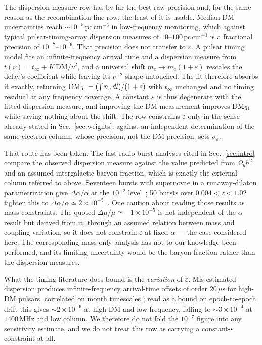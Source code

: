 \documentclass[aps,prd,twocolumn,superscriptaddress,nofootinbib,10pt]{revtex4-2}
\begin{document}
The dispersion-measure row has by far the best raw precision and, for the same reason as the
recombination-line row, the least of it is usable. Median DM uncertainties reach
$\sim\!10^{-5}\,\mathrm{pc\,cm^{-3}}$ in low-frequency monitoring, which against typical
pulsar-timing-array dispersion measures of $10$--$100\,\mathrm{pc\,cm^{-3}}$ is a fractional
precision of $10^{-7}$--$10^{-6}$. That precision does not transfer to $\varepsilon$. A pulsar
timing model fits an infinite-frequency arrival time and a dispersion measure from
$t(\nu) = t_{\infty} + K\,\mathrm{DM}/\nu^{2}$, and a universal shift $m_e \to m_e(1+\varepsilon)$
rescales the delay's coefficient while leaving its $\nu^{-2}$ shape untouched. The fit therefore
absorbs it exactly, returning $\mathrm{DM}_{\rm fit} = (\int n_e\,dl)/(1+\varepsilon)$ with
$t_{\infty}$ unchanged and no timing residual at any frequency coverage. A constant $\varepsilon$
is thus degenerate with the fitted dispersion measure, and improving the DM measurement improves
$\mathrm{DM}_{\rm fit}$ while saying nothing about the shift. The row constrains $\varepsilon$ only
in the sense already stated in Sec.~\ref{sec:weights}: against an independent determination of the
same electron column, whose precision, not the DM precision, sets $\sigma_\varepsilon$.

That route has been taken. The fast-radio-burst analyses cited in Sec.~\ref{sec:intro} compare the
observed dispersion measure against the value predicted from $\Omega_b h^{2}$ and an assumed
intergalactic baryon fraction, which is exactly the external column referred to above. Seventeen
bursts with supernovae in a runaway-dilaton parametrization give $\Delta\alpha/\alpha$ at the
$10^{-2}$ level~\cite{Lemos2025}; 50 bursts over $0.004 < z < 1.02$ tighten this to
$\Delta\alpha/\alpha \simeq 2 \times 10^{-5}$~\cite{Kalita2024}. One caution about reading those
results as mass constraints. The quoted $\Delta\mu/\mu \simeq -1 \times 10^{-5}$ is not independent
of the $\alpha$ result but derived from it, through an assumed relation between mass and coupling
variation, so it does not constrain $\varepsilon$ at fixed $\alpha$ --- the case considered here.
The corresponding mass-only analysis has not to our knowledge been performed, and its limiting
uncertainty would be the baryon fraction rather than the dispersion measures.

What the timing literature does bound is the \emph{variation} of $\varepsilon$. Mis-estimated
dispersion produces infinite-frequency arrival-time offsets of order $20\,\mu\mathrm{s}$ for
high-DM pulsars, correlated on month timescales
\citep{JonesNANOGrav2017,NANOGravDM2023}; read as a bound on epoch-to-epoch drift this gives
$\sim\!2\times10^{-6}$ at high DM and low frequency, falling to $\sim\!3\times10^{-4}$ at
$1400\,\mathrm{MHz}$ and low column. We therefore do not fold the $10^{-7}$ figure into any
sensitivity estimate, and we do not treat this row as carrying a constant-$\varepsilon$ constraint
at all.
\end{document}
